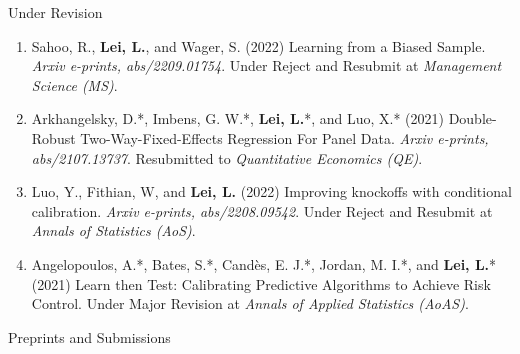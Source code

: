 \documentclass{article}
\newcommand{\red}[1]{{\color{red} #1}}
\begin{document}
\begin{large}
\noindent Under Revision
\end{large}

\begin{enumerate}
\item \red{Sahoo, R., \textbf{Lei, L.}, and Wager, S. (2022) Learning from a Biased Sample. \emph{Arxiv e-prints, abs/2209.01754}. Under Reject and Resubmit at \emph{Management Science (MS)}.}
\item \red{Arkhangelsky, D.*, Imbens, G. W.*, \textbf{Lei, L.}*, and Luo, X.* (2021) Double-Robust Two-Way-Fixed-Effects Regression For Panel Data. \emph{Arxiv e-prints, abs/2107.13737}. Resubmitted to \emph{Quantitative Economics (QE)}.}
\item \red{Luo, Y., Fithian, W, and \textbf{Lei, L.} (2022) Improving knockoffs with conditional calibration. \emph{Arxiv e-prints, abs/2208.09542}. Under Reject and Resubmit at \emph{Annals of Statistics (AoS)}.}
\item \red{Angelopoulos, A.*, Bates, S.*, Cand\`{e}s, E. J.*, Jordan, M. I.*, and \textbf{Lei, L.}* (2021) Learn then Test: Calibrating Predictive Algorithms to Achieve Risk Control. Under Major Revision at \emph{Annals of Applied Statistics (AoAS)}.}
\end{enumerate}

\begin{large}
\noindent Preprints and Submissions
\end{large}
\end{document}
